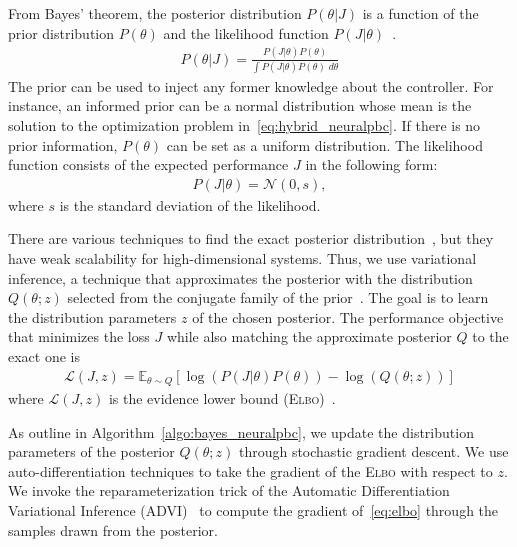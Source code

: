 From Bayes' theorem, the posterior distribution $P(\theta |J)$ is a function of
the prior distribution $P(\theta)$ and the likelihood function $P(J |
\theta)$~\cite{bishop2006pattern}.
\begin{align}
  P(\theta | J) = \frac{P(J | \theta) P(\theta)}{\int P(J | \theta) P(\theta) \; d \theta}
  \label{eq:bayes}
\end{align} 
The prior can be used to inject any former knowledge about the controller. 
%
For instance, an informed prior can be a normal distribution whose mean is the
solution to the optimization problem in~\eqref{eq:hybrid_neuralpbc}. If there is
no prior information, $P(\theta)$ can be set as a uniform distribution.
%
The likelihood function consists of the expected performance $J$ in the following form:
\begin{align}
  P(J|\theta) = \mathcal{N}(0, s),
  \label{eq:likelihood}
\end{align}
\noindent where $s$ is the standard deviation of the likelihood.
%


There are various techniques to find the exact posterior
distribution~\cite{bishop2006pattern}, but they have weak scalability
for high-dimensional systems. Thus, we use variational inference, a technique
that approximates the posterior with the distribution $Q(\theta;z)$ selected
from the conjugate family of the prior~\cite{cohen2016bayesian}. 
%
The goal is to learn the distribution parameters $z$ of the chosen posterior.
%
The performance objective that minimizes the loss $J$ while also matching the 
approximate posterior $Q$ to the exact one is
\begin{align}
  \mathcal{L}(J, z) = \mathbb{E}_{\theta \sim Q}[ \log{(P(J | \theta) P(\theta))} - \log{(Q(\theta;z))}]
  \label{eq:elbo}
\end{align}
\noindent where $\mathcal{L}(J, z)$ is the evidence lower bound (\textsc{Elbo})~\cite{tipping2003bayesian}.
%

As outline in Algorithm~\eqref{algo:bayes_neuralpbc}, we update the distribution
parameters of the posterior $Q(\theta;z)$ through stochastic gradient descent. 
%
We use auto-differentiation techniques to take the gradient of the \textsc{Elbo}
with respect to $z$.
%
We invoke the reparameterization trick of the Automatic Differentiation
Variational Inference (ADVI)~\cite{kucukelbir2015automatic} to compute the
gradient of~\eqref{eq:elbo} through the samples drawn from the posterior.

